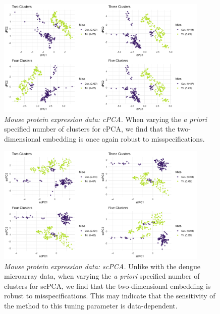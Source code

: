 \documentclass{article}
\begin{document}
\begin{figure}[!htbp]
    \centering
    \includegraphics[width=0.9\textwidth]{figures/mice_cpca_centers}
    \caption{
    \textit{Mouse protein expression data: cPCA.}
    When varying the \textit{a priori} specified number of clusters for cPCA, we find that the two-dimensional embedding is once again robust to misspecifications.
    }
    \label{fig:mice_cpca_centers}
\end{figure}

\begin{figure}[!htbp]
    \centering
    \includegraphics[width=0.9\textwidth]{figures/mice_scpca_centers}
    \caption{
    \textit{Mouse protein expression data: scPCA.}
    Unlike with the dengue microarray data, when varying the \textit{a priori} specified number of clusters for scPCA, we find that the two-dimensional embedding is robust to misspecifications. This may indicate that the sensitivity of the method to this tuning parameter is data-dependent.
    }
    \label{fig:mice_scpca_centers}
\end{figure}
\end{document}
